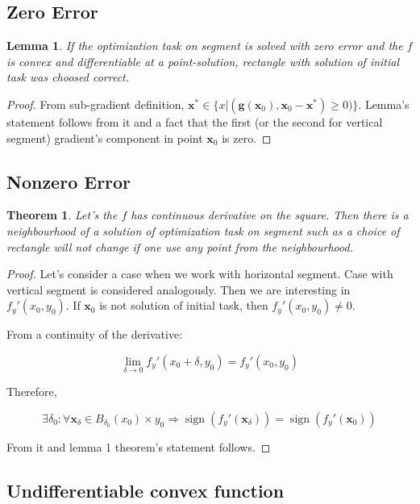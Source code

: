 \documentclass[12pt]{article}
\newtheorem{theorem}{Theorem}[section]
\newtheorem{lemma}{Lemma}[section]
\DeclareMathOperator{\sign}{sign}
\begin{document}
\subsection{Zero Error}

\begin{lemma}\label{l1}
If the optimization task on segment is solved with zero error and the $f$ is convex and differentiable at a point-solution, rectangle with solution of initial task was choosed correct.
\end{lemma}
\begin{proof}
From sub-gradient definition, $\textbf{x}^* \in \{x|(\textbf{g}(\textbf{x}_0), \textbf{x}_0 - \textbf{x}^*) \geq 0)\}$. Lemma's statement follows from it and a fact that the first (or the second for vertical segment) gradient's component in point $\textbf{x}_0$ is zero.
\end{proof}


\subsection{Nonzero Error}
\begin{theorem}
Let's the $f$ has continuous derivative on the square. Then there is a neighbourhood of a solution of optimization task on segment such as a choice of rectangle will not change if one use any point from the   neighbourhood.
\end{theorem}
\begin{proof}
Let's consider a case when we work with horizontal segment. Case with vertical segment is considered analogously. Then we are interesting in $f_y'(x_0, y_0)$. If $\textbf{x}_0$ is not solution of initial task, then $f_y'(x_0, y_0) \neq 0$. 

From a continuity of the derivative:

$$\lim\limits_{\delta \rightarrow 0}f_y'(x_0+\delta, y_0) = f_y'(x_0, y_0)$$

Therefore, 

$$\exists \delta_0:\forall \textbf{x}_\delta\in B_{\delta_0}(x_0)\times y_0\Rightarrow \sign(f_y'(\textbf{x}_\delta)) = \sign(f_y'(\textbf{x}_0))$$

From it and lemma 1 theorem's statement follows.

\end{proof}

\subsection{Undifferentiable convex function}
\end{document}
